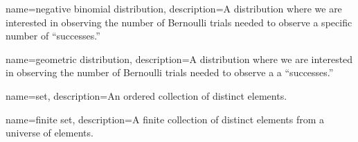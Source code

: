 {
    name={negative binomial distribution},
    description={A distribution where we are interested in observing the number of Bernoulli trials needed to observe a specific number of ``successes.''}
}

{
    name={geometric distribution},
    description={A distribution where we are interested in observing the number of Bernoulli trials needed to observe a a ``successes.''}
}

{
    name={set},
    description={An ordered collection of distinct elements.}
}

{
    name={finite set},
    description={A finite collection of distinct elements from a universe of elements.}
}

